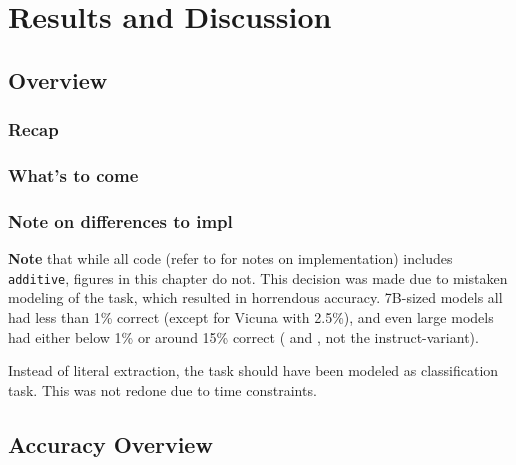 \chapter{Results and Discussion}\label{chap:results}
\section{Overview}
\subsection{Recap}

\subsection{What's to come}

\subsection{Note on differences to impl}
\textbf{Note} that while all code (refer to  for notes on implementation) includes \texttt{additive}, figures in this chapter do not.
This decision was made due to mistaken modeling of the task, which resulted in horrendous accuracy.
7B-sized models all had less than 1\% correct (except for Vicuna with 2.5\%), and even large models had either below 1\% or around 15\% correct ( and , not the instruct-variant).

Instead of literal extraction, the task should have been modeled as classification task.
This was not redone due to time constraints.







\section{Accuracy Overview}\label{sec:result:first}

